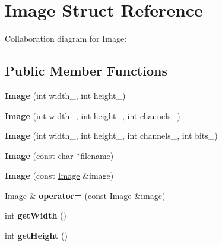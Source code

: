 \hypertarget{class_image}{\section{Image Struct Reference}
\label{class_image}
}


Collaboration diagram for Image\+:
\subsection*{Public Member Functions}
\begin{DoxyCompactItemize}
\item 
\hypertarget{class_image_a1191ef79ad0978a37356835c5c388cbd}{{\bfseries Image} (int width\+\_\+, int height\+\_\+)}\label{class_image_a1191ef79ad0978a37356835c5c388cbd}

\item 
\hypertarget{class_image_a7cd59ec2f4a7f4f222b564bb6817d5e3}{{\bfseries Image} (int width\+\_\+, int height\+\_\+, int channels\+\_\+)}\label{class_image_a7cd59ec2f4a7f4f222b564bb6817d5e3}

\item 
\hypertarget{class_image_a1bb743835ed0bef2e8ae7378ed8a436d}{{\bfseries Image} (int width\+\_\+, int height\+\_\+, int channels\+\_\+, int bits\+\_\+)}\label{class_image_a1bb743835ed0bef2e8ae7378ed8a436d}

\item 
\hypertarget{class_image_a9700f58efb58b13e23666f19c67d3839}{{\bfseries Image} (const char $\ast$filename)}\label{class_image_a9700f58efb58b13e23666f19c67d3839}

\item 
\hypertarget{class_image_a34410a36b132ab597a8878d45facc89a}{{\bfseries Image} (const \hyperlink{class_image}{Image} \&image)}\label{class_image_a34410a36b132ab597a8878d45facc89a}

\item 
\hypertarget{class_image_a7a2b82cfaebc08e1184b3df9cbb890f7}{\hyperlink{class_image}{Image} \& {\bfseries operator=} (const \hyperlink{class_image}{Image} \&image)}\label{class_image_a7a2b82cfaebc08e1184b3df9cbb890f7}

\item 
\hypertarget{class_image_af2720a072812763395512fc3c8c21362}{int {\bfseries get\+Width} ()}\label{class_image_af2720a072812763395512fc3c8c21362}

\item 
\hypertarget{class_image_aa4e1f064e5e1f3f04ad605408f1ec3af}{int {\bfseries get\+Height} ()}\label{class_image_aa4e1f064e5e1f3f04ad605408f1ec3af}


\end{DoxyCompactItemize}

